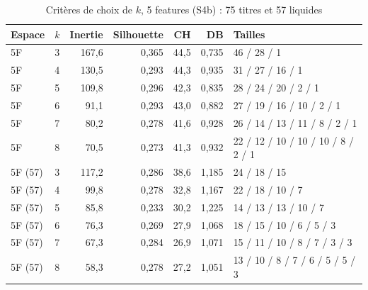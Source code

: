 \documentclass[11pt,a4paper]{article}
\begin{document}
\begin{table}[H]\centering\small
\caption{Critères de choix de $k$, 5 features (S4b) : 75 titres et 57 liquides}\label{tab:annexe-k5f}
\begin{tabular}{llrrrrl}\toprule
Espace & $k$ & Inertie & Silhouette & CH & DB & Tailles \\ \midrule
5F & 3 & 167{,}6 & 0{,}365 & 44{,}5 & 0{,}735 & 46 / 28 / 1 \\
5F & 4 & 130{,}5 & 0{,}293 & 44{,}3 & 0{,}935 & 31 / 27 / 16 / 1 \\
5F & 5 & 109{,}8 & 0{,}296 & 42{,}3 & 0{,}835 & 28 / 24 / 20 / 2 / 1 \\
5F & 6 & 91{,}1 & 0{,}293 & 43{,}0 & 0{,}882 & 27 / 19 / 16 / 10 / 2 / 1 \\
5F & 7 & 80{,}2 & 0{,}278 & 41{,}6 & 0{,}928 & 26 / 14 / 13 / 11 / 8 / 2 / 1 \\
5F & 8 & 70{,}5 & 0{,}273 & 41{,}3 & 0{,}932 & 22 / 12 / 10 / 10 / 10 / 8 / 2 / 1 \\
\midrule
5F (57) & 3 & 117{,}2 & 0{,}286 & 38{,}6 & 1{,}185 & 24 / 18 / 15 \\
5F (57) & 4 & 99{,}8 & 0{,}278 & 32{,}8 & 1{,}167 & 22 / 18 / 10 / 7 \\
5F (57) & 5 & 85{,}8 & 0{,}233 & 30{,}2 & 1{,}225 & 14 / 13 / 13 / 10 / 7 \\
5F (57) & 6 & 76{,}3 & 0{,}269 & 27{,}9 & 1{,}068 & 18 / 15 / 10 / 6 / 5 / 3 \\
5F (57) & 7 & 67{,}3 & 0{,}284 & 26{,}9 & 1{,}071 & 15 / 11 / 10 / 8 / 7 / 3 / 3 \\
5F (57) & 8 & 58{,}3 & 0{,}278 & 27{,}2 & 1{,}051 & 13 / 10 / 8 / 7 / 6 / 5 / 5 / 3 \\
\bottomrule\end{tabular}\end{table}
\end{document}
